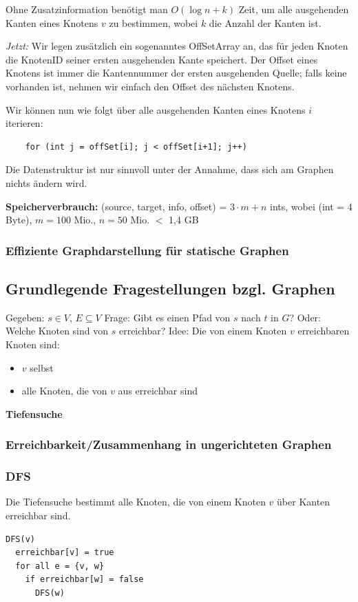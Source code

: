 \documentclass{article}
\begin{document}
Ohne Zusatzinformation benötigt man $O(\log n + k)$ Zeit, um alle ausgehenden Kanten eines Knotens $v$ zu bestimmen, wobei $k$ die Anzahl der Kanten ist.

\textit{Jetzt:} Wir legen zusätzlich ein sogenanntes OffSetArray an, das für jeden Knoten die KnotenID seiner ersten ausgehenden Kante speichert.  
Der Offset eines Knotens ist immer die Kantennummer der ersten ausgehenden Quelle; falls keine vorhanden ist, nehmen wir einfach den Offset des nächsten Knotens.

Wir können nun wie folgt über alle ausgehenden Kanten eines Knotens $i$ iterieren:

\begin{verbatim}
    for (int j = offSet[i]; j < offSet[i+1]; j++)
\end{verbatim}

Die Datenstruktur ist nur sinnvoll unter der Annahme, dass sich am Graphen nichts ändern wird.

\textbf{Speicherverbrauch:} (source, target, info, offset) =  
$3 \cdot m + n$ ints, wobei (int = 4 Byte), $m = 100$ Mio., $n = 50$ Mio. $<$ 1,4 GB

\subsubsection{Effiziente Graphdarstellung für statische Graphen}

\subsection{Grundlegende Fragestellungen bzgl. Graphen}
Gegeben: $s \in V$, $E \subseteq V$  
Frage: Gibt es einen Pfad von $s$ nach $t$ in $G$? Oder: Welche Knoten sind von $s$ erreichbar?  
Idee: Die von einem Knoten $v$ erreichbaren Knoten sind:
\begin{itemize}
    \item $v$ selbst
    \item alle Knoten, die von $v$ aus erreichbar sind
\end{itemize}

\rightarrow \textbf{Tiefensuche}
\subsubsection{Erreichbarkeit/Zusammenhang in ungerichteten Graphen}

\subsubsection{DFS}
Die Tiefensuche bestimmt alle Knoten, die von einem Knoten $v$ über Kanten erreichbar sind.
\begin{verbatim}
DFS(v)
  erreichbar[v] = true
  for all e = {v, w}
    if erreichbar[w] = false
      DFS(w)
\end{verbatim}
\end{document}
